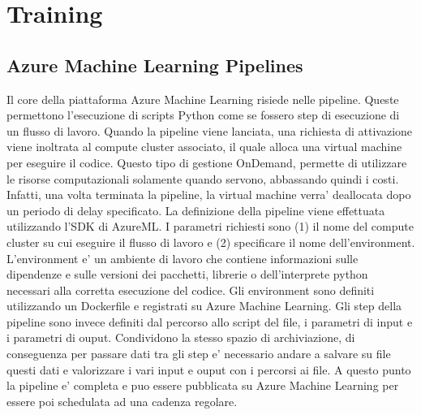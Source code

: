 \section{Training}
\subsection{Azure Machine Learning Pipelines}
Il core della piattaforma Azure Machine Learning risiede nelle pipeline. Queste permettono l'esecuzione di scripts Python come se fossero step di esecuzione di un flusso di lavoro. Quando la pipeline viene lanciata, una richiesta di attivazione viene inoltrata al compute cluster associato, il quale alloca una virtual machine per eseguire il codice. Questo tipo di gestione OnDemand, permette di utilizzare le risorse computazionali solamente quando servono, abbassando quindi i costi. Infatti, una volta terminata la pipeline, la virtual machine verra' deallocata dopo un periodo di delay specificato.
La definizione della pipeline viene effettuata utilizzando l'SDK di AzureML. 
I parametri richiesti sono (1) il nome del compute cluster su cui eseguire il flusso di lavoro e (2) specificare il nome dell'environment. L'environment e' un ambiente di lavoro che contiene informazioni sulle dipendenze e sulle versioni dei pacchetti, librerie o dell'interprete python necessari alla corretta esecuzione del codice. Gli environment sono definiti utilizzando un Dockerfile e registrati su Azure Machine Learning.
Gli step della pipeline sono invece definiti dal percorso allo script del file, i parametri di input e i parametri di ouput. Condividono la stesso spazio di archiviazione, di conseguenza per passare dati tra gli step e' necessario andare a salvare su file questi dati e valorizzare i vari input e ouput con i percorsi ai file.
A questo punto la pipeline e' completa e puo essere pubblicata su Azure Machine Learning per essere poi schedulata ad una cadenza regolare.


